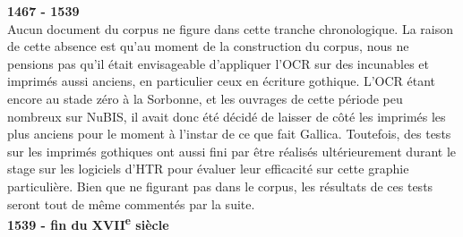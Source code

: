 \documentclass[a4paper,12pt,twoside]{book}
\begin{document}
	\textbf{1467 - 1539} \\
	
	Aucun document du corpus ne figure dans cette tranche chronologique. La raison de cette absence est qu'au moment de la construction du corpus, nous ne pensions pas qu'il était envisageable d'appliquer l'OCR sur des incunables et imprimés aussi anciens, en particulier ceux en écriture gothique. L'OCR étant encore au stade zéro à la Sorbonne, et les ouvrages de cette période peu nombreux sur NuBIS, il avait donc été décidé de laisser de côté les imprimés les plus anciens pour le moment à l'instar de ce que fait Gallica. Toutefois, des tests sur les imprimés gothiques ont aussi fini par être réalisés ultérieurement durant le stage sur les logiciels d'HTR pour évaluer leur efficacité sur cette graphie particulière. Bien que ne figurant pas dans le corpus, les résultats de ces tests seront tout de même commentés par la suite. \\
	
	\textbf{1539 - fin du XVII\textsuperscript{e} siècle} \\
	
\end{document}
